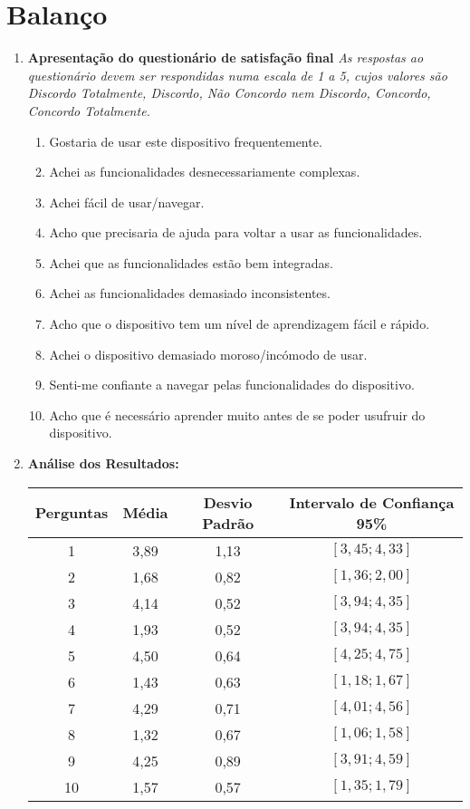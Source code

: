 \documentclass[11pt]{article}
\begin{document}
\section*{Balanço}
    \begin{enumerate}
        \item \textbf{Apresentação do questionário de satisfação final}
            \textit{As respostas ao questionário devem ser respondidas numa escala de 1 a 5, cujos valores são Discordo Totalmente, Discordo, Não Concordo nem Discordo, Concordo, Concordo Totalmente.}
             \begin{enumerate}[label=\arabic*)]
                \item Gostaria de usar este dispositivo frequentemente.
                \item Achei as funcionalidades desnecessariamente complexas.
                \item Achei fácil de usar/navegar.
                \item Acho que precisaria de ajuda para voltar a usar as funcionalidades.
                \item Achei que as funcionalidades estão bem integradas.
                \item Achei as funcionalidades demasiado inconsistentes.
                \item Acho que o dispositivo tem um nível de aprendizagem fácil e rápido.
                \item Achei o dispositivo demasiado moroso/incómodo de usar.
                \item Senti-me confiante a navegar pelas funcionalidades do dispositivo.
                \item Acho que é necessário aprender muito antes de se poder usufruir do dispositivo.
            \end{enumerate}
        
        \item \textbf{Análise dos Resultados:}\\
\begin{center}
 \begin{tabular}{|c | c c c |} 
 \hline
 Perguntas & Média & Desvio Padrão & Intervalo de Confiança 95\% \\ [0.5ex] 
 \hline
 1 & 3,89 & 1,13 & $[3,45;4,33]$\\ 
 \hline
 2 & 1,68 & 0,82 & $[1,36;2,00]$\\
 \hline
 3 & 4,14 & 0,52 & $[3,94;4,35]$\\
 \hline
 4 & 1,93 & 0,52 & $[3,94;4,35]$\\
 \hline
 5 & 4,50 & 0,64 & $[4,25;4,75]$\\
 \hline
 6 & 1,43 & 0,63 &$[1,18;1,67]$\\
 \hline
 7 & 4,29 & 0,71 & $[4,01;4,56]$\\
 \hline
 8 & 1,32 & 0,67 & $[1,06;1,58]$\\
 \hline
 9 & 4,25 & 0,89 & $[3,91;4,59]$\\
 \hline
 10 & 1,57 & 0,57 & $[1,35;1,79]$\\
 \hline
\end{tabular}
\end{center}
        

\end{enumerate}
\end{document}
